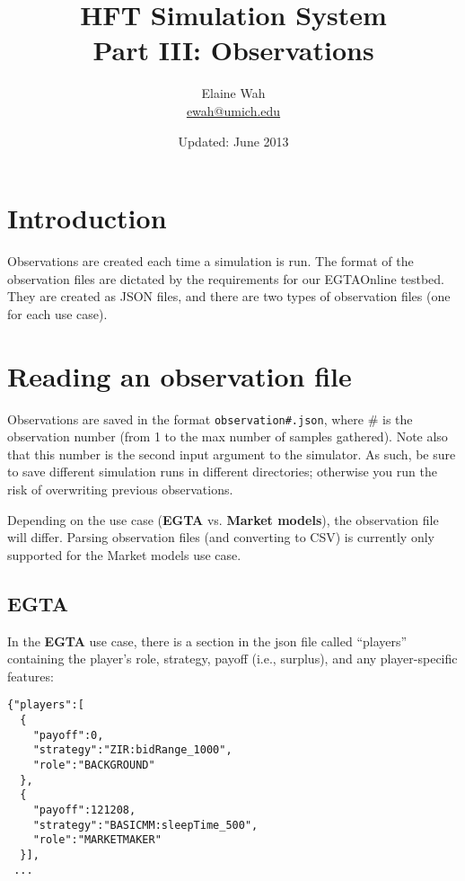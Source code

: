 \documentclass[11pt]{article}
\begin{document}
	
\title{HFT Simulation System \\
Part III: Observations}
\author{
Elaine Wah\\
\href{mailto:ewah@umich.edu}{ewah@umich.edu}
}
\date{Updated: June 2013}
\maketitle

\section{Introduction}

Observations are created each time a simulation is run.
The format of the observation files are dictated by the requirements for our EGTAOnline testbed. They are created as JSON files, and there are two types of observation files (one for each use case).

\section{Reading an observation file}

Observations are saved in the format \verb|observation#.json|, where \# is the observation number (from 1 to the max number of samples gathered). Note also that this number is the second input argument to the simulator.
As such, be sure to save different simulation runs in different directories; otherwise you run the risk of overwriting previous observations.

Depending on the use case (\textbf{EGTA} vs. \textbf{Market models}), the observation file will differ. Parsing observation files (and converting to CSV) is currently only supported for the Market models use case.

\subsection{EGTA}

In the \textbf{EGTA} use case, there is a section in the json file called ``players'' containing the player's role, strategy, payoff (i.e., surplus), and any player-specific features:

\begin{verbatim}
{"players":[
  {
    "payoff":0,
    "strategy":"ZIR:bidRange_1000",
    "role":"BACKGROUND"
  },
  {
    "payoff":121208,
    "strategy":"BASICMM:sleepTime_500",
    "role":"MARKETMAKER"
  }],
 ...
\end{verbatim}
\end{document}
